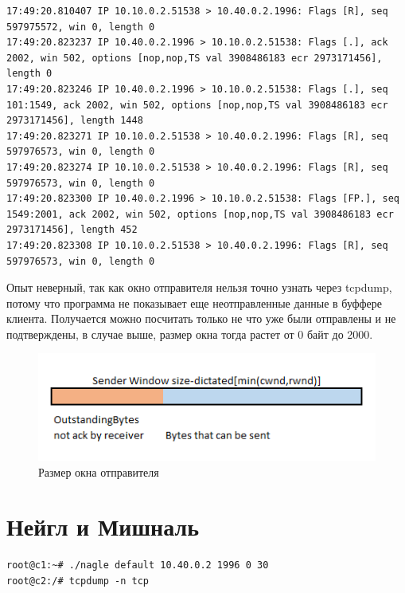 \documentclass[a4paper,12pt]{article}
\begin{document}
\begin{Verbatim}
17:49:20.810407 IP 10.10.0.2.51538 > 10.40.0.2.1996: Flags [R], seq 597975572, win 0, length 0
17:49:20.823237 IP 10.40.0.2.1996 > 10.10.0.2.51538: Flags [.], ack 2002, win 502, options [nop,nop,TS val 3908486183 ecr 2973171456], length 0
17:49:20.823246 IP 10.40.0.2.1996 > 10.10.0.2.51538: Flags [.], seq 101:1549, ack 2002, win 502, options [nop,nop,TS val 3908486183 ecr 2973171456], length 1448
17:49:20.823271 IP 10.10.0.2.51538 > 10.40.0.2.1996: Flags [R], seq 597976573, win 0, length 0
17:49:20.823274 IP 10.10.0.2.51538 > 10.40.0.2.1996: Flags [R], seq 597976573, win 0, length 0
17:49:20.823300 IP 10.40.0.2.1996 > 10.10.0.2.51538: Flags [FP.], seq 1549:2001, ack 2002, win 502, options [nop,nop,TS val 3908486183 ecr 2973171456], length 452
17:49:20.823308 IP 10.10.0.2.51538 > 10.40.0.2.1996: Flags [R], seq 597976573, win 0, length 0
\end{Verbatim}

Опыт неверный, так как окно отправителя нельзя точно узнать через tcpdump, потому что программа не показывает еще неотправленные данные в буффере клиента. Получается можно посчитать только не что уже были отправлены и не подтверждены, в случае выше, размер окна тогда растет от 0 байт до 2000.

\begin{figure}
\centering
\includegraphics{sender_congestion_window.png}
\caption{Размер окна отправителя}
\label{fig:sender_congestion_window}
\end{figure}

\section{Нейгл и Мишналь}


\begin{Verbatim}
root@c1:~# ./nagle default 10.40.0.2 1996 0 30
root@c2:/# tcpdump -n tcp
\end{Verbatim}
\end{document}
